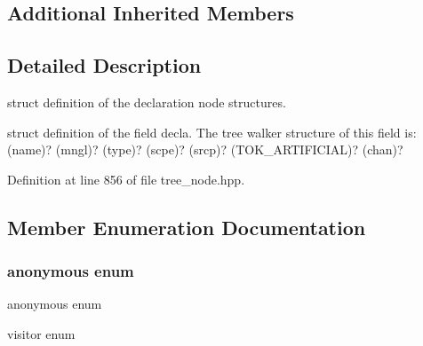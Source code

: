 \subsection*{Additional Inherited Members}


\subsection{Detailed Description}
struct definition of the declaration node structures. 

struct definition of the field decla. The tree walker structure of this field is\+: (name)? (mngl)? (type)? (scpe)? (srcp)? (T\+O\+K\+\_\+\+A\+R\+T\+I\+F\+I\+C\+I\+AL)? (chan)? 

Definition at line 856 of file tree\+\_\+node.\+hpp.



\subsection{Member Enumeration Documentation}
\mbox{\label{structdecl__node_a7d7ab7893f21527db576f4ef976365a3}} 
\subsubsection{\texorpdfstring{anonymous enum}{anonymous enum}}
{\footnotesize\ttfamily anonymous enum}



visitor enum 

